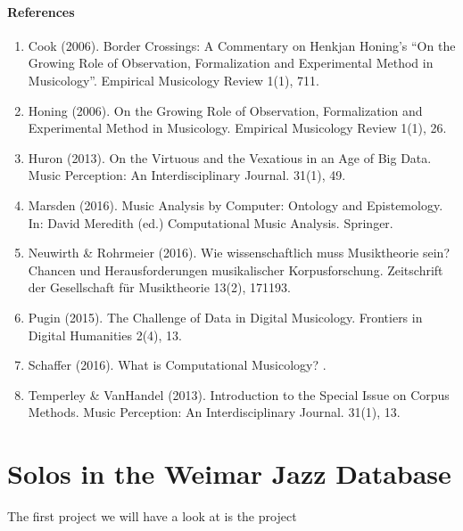 \documentclass[letterpaper,10pt,english]{sphinxmanual}
\begin{document}
\subsubsection*{References}
\begin{enumerate}
%
\item {} 
Cook (2006). Border Crossings: A Commentary on Henkjan Honing’s “On the Growing Role of Observation, Formalization and Experimental Method in Musicology”. Empirical Musicology Review 1(1), 7\sphinxhyphen{}11.

\item {} 
Honing (2006). On the Growing Role of Observation, Formalization and Experimental Method in Musicology. Empirical Musicology Review 1(1), 2\sphinxhyphen{}6.

\item {} 
Huron (2013). On the Virtuous and the Vexatious in an Age of Big Data. Music Perception: An Interdisciplinary Journal. 31(1), 4\sphinxhyphen{}9.

\item {} 
Marsden (2016). Music Analysis by Computer: Ontology and Epistemology. In: David Meredith (ed.) Computational Music Analysis. Springer.

\item {} 
Neuwirth \& Rohrmeier (2016). Wie wissenschaftlich muss Musiktheorie sein? Chancen und Herausforderungen musikalischer Korpusforschung. Zeitschrift der Gesellschaft für Musiktheorie 13(2), 171\sphinxhyphen{}193.

\item {} 
Pugin (2015). The Challenge of Data in Digital Musicology. Frontiers in Digital Humanities 2(4), 1\sphinxhyphen{}3.

\item {} 
Schaffer (2016). What is Computational Musicology? .

\item {} 
Temperley \& VanHandel (2013). Introduction to the Special Issue on Corpus Methods. Music Perception: An Interdisciplinary Journal. 31(1), 1\sphinxhyphen{}3.

\end{enumerate}


\chapter{Solos in the Weimar Jazz Database}
\label{\detokenize{jazz_solos:solos-in-the-weimar-jazz-database}}\label{\detokenize{jazz_solos::doc}}
The first project we will have a look at is the  project
\end{document}

